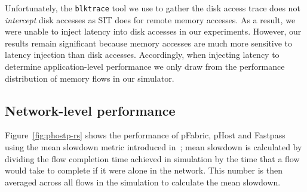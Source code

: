 Unfortunately, the \texttt{blktrace} tool we use to gather the disk access trace does not \emph{intercept} disk accesses as SIT does for remote memory accesses. As a result, we were unable to inject latency into disk accesses in our experiments. However, our results remain significant because memory accesses are much more sensitive to latency injection than disk accesses. Accordingly, when injecting latency to determine application-level performance we only draw from the performance distribution of memory flows in our simulator.





\subsection{Network-level performance}
\label{ssec:nlp}
Figure~\ref{fig:phostp-rs} shows the performance of pFabric, pHost and Fastpass using the mean slowdown metric introduced in~\cite{pfabric}; mean slowdown is calculated by dividing  the flow completion time achieved in simulation by the time that a flow would take to complete if it were alone in the network. This number is then averaged across all flows in the simulation to calculate the mean slowdown. 

